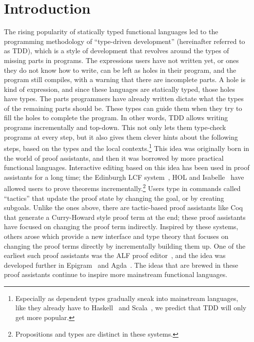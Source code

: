 \chapter{Introduction} \label{chap:introduction}

The rising popularity of statically typed functional languages led to
the programming methodology of ``type-driven development'' (hereinafter referred to as TDD),
which is a style of development that revolves around the types of missing parts in
programs. The expressions users have not written yet, or ones they do not know
how to write, can be left as holes in their program, and the program still
compiles, with a warning that there are incomplete parts.
A hole is kind of expression, and since these languages are
statically typed, those holes have types. The parts
programmers have already written dictate what the types of the remaining parts should
be. These types can guide them when they try to fill the holes to complete the program.
In other words, TDD allows writing programs incrementally and top-down. This
not only lets them type-check programs at every step, but it also gives them clever
hints about the following steps, based on the types and the local
contexts.\footnote{Especially as dependent types gradually sneak into
mainstream languages, like they already have to Haskell~\cite{eisenberg} and
Scala~\cite{scalaDep}, we predict that TDD will only get more popular.}
This idea was originally born in the world of proof assistants, and then it was
borrowed by more practical functional languages.
Interactive editing based on this idea has been used in proof assistants for a long
time; the Edinburgh LCF system~\cite{lcf}, HOL and
Isabelle~\cite{isabelle} have allowed users to prove theorems
incrementally.\footnote{Propositions and types are distinct in these systems.}
Users type in commands called ``tactics'' that update the proof state by
changing the goal, or by creating subgoals.
Unlike the ones above, there are tactic-based proof assistants like
Coq~\cite{coq} that generate a Curry-Howard style proof term at the end; these
proof assistants have focused on changing the proof term indirectly.
Inspired by these systems, others arose which
provide a new interface and type theory that focuses on
changing the proof terms directly by incrementally building them
up.
One of the earliest such proof assistants was the ALF proof
editor~\cite{ALF}, and the idea was developed further in Epigram~\cite{epigram}
and Agda~\cite{agda}.
The ideas that are brewed in these proof assistants continue to inspire more
mainstream functional languages.

